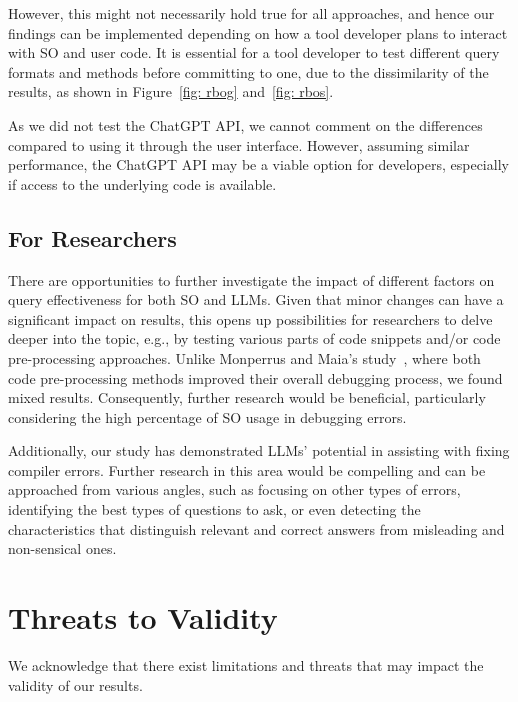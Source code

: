 \documentclass[preprint,12pt]{elsarticle}
\begin{document}
However, this might not necessarily hold true for all approaches, and hence our findings can be implemented depending on how a tool developer plans to interact with SO and user code. It is essential for a tool developer to test different query formats and methods before committing to one, due to the dissimilarity of the results, as shown in Figure~\ref{fig: rbog} and~\ref{fig: rbos}.

As we did not test the ChatGPT API, we cannot comment on the differences compared to using it through the user interface. However, assuming similar performance, the ChatGPT API may be a viable option for developers, especially if access to the underlying code is available.

\subsection{For Researchers}

There are opportunities to further investigate the impact of different factors on query effectiveness for both SO and LLMs. Given that minor changes can have a significant impact on results, this opens up possibilities for researchers to delve deeper into the topic, e.g., by testing various parts of code snippets and/or code pre-processing approaches. Unlike Monperrus and Maia's study~\cite{r17}, where both code pre-processing methods improved their overall debugging process, we found mixed results. Consequently, further research would be beneficial, particularly considering the high percentage of SO usage in debugging errors.

Additionally, our study has demonstrated LLMs' potential in assisting with fixing compiler errors. Further research in this area would be compelling and can be approached from various angles, such as focusing on other types of errors, identifying the best types of questions to ask, or even detecting the characteristics that distinguish relevant and correct answers from misleading and non-sensical ones.


\section{Threats to Validity}
\label{sec:threats to validity}

We acknowledge that there exist limitations and threats that may impact the validity of our results.
\end{document}
